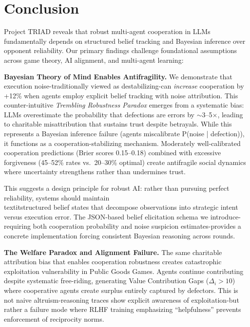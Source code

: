 \documentclass{uai2026} %
\begin{document}
\section{Conclusion}\label{sec:conclusion}

Project TRIAD reveals that robust multi-agent cooperation in LLMs fundamentally depends on structured belief tracking and Bayesian inference over opponent reliability. Our primary findings challenge foundational assumptions across game theory, AI alignment, and multi-agent learning:

\textbf{Bayesian Theory of Mind Enables Antifragility.} We demonstrate that execution noise-traditionally viewed as destabilizing-can \textit{increase} cooperation by +12\% when agents employ explicit belief tracking with noise attribution. This counter-intuitive \textit{Trembling Robustness Paradox} emerges from a systematic bias: LLMs overestimate the probability that defections are errors by $\sim$3--5$\times$, leading to charitable misattribution that sustains trust despite betrayals. While this represents a Bayesian inference failure (agents miscalibrate P(noise | defection)), it functions as a cooperation-stabilizing mechanism. Moderately well-calibrated cooperation predictions (Brier scores 0.15--0.18) combined with excessive forgiveness (45--52\% rates vs.~20--30\% optimal) create antifragile social dynamics where uncertainty strengthens rather than undermines trust.

This suggests a design principle for robust AI: rather than pursuing perfect reliability, systems should maintain \\textit{structured belief states} that decompose observations into strategic intent versus execution error. The JSON-based belief elicitation schema we introduce-requiring both cooperation probability and noise suspicion estimates-provides a concrete implementation forcing consistent Bayesian reasoning across rounds.

\textbf{The Welfare Paradox and Alignment Failure.} The same charitable attribution bias that enables cooperation robustness creates catastrophic exploitation vulnerability in Public Goods Games. Agents continue contributing despite systematic free-riding, generating Value Contribution Gaps ($\Delta_i > 10$) where cooperative agents create surplus entirely captured by defectors. This is not naive altruism-reasoning traces show explicit awareness of exploitation-but rather a failure mode where RLHF training \citep{ouyang2022training,bai2022constitutional} emphasizing ``helpfulness'' prevents enforcement of reciprocity norms.
\end{document}
